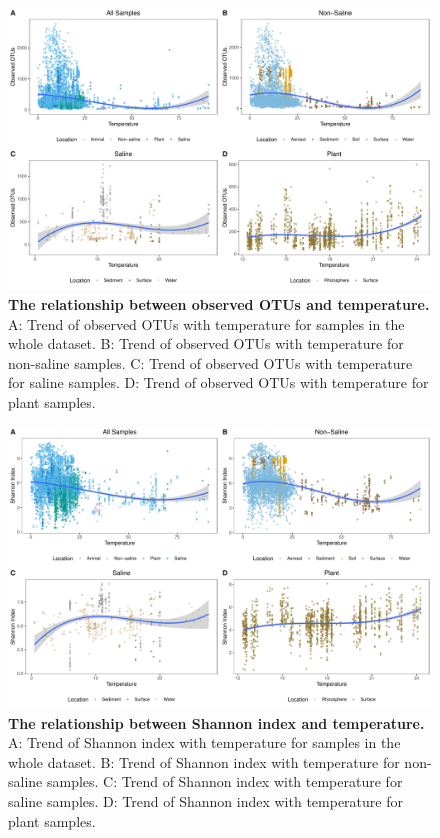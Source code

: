 \begin{figure}[H]
    \centering
    \includegraphics[scale=0.33]{./Figures/OO_T_empo2}
    \caption{\textbf{The relationship between observed OTUs and temperature.} A: Trend of observed OTUs with temperature for samples in the whole dataset. B: Trend of observed OTUs with temperature for non-saline samples. C: Trend of observed OTUs with temperature for saline samples. D: Trend of observed OTUs with temperature for plant samples.}
    \label{fig:OO_T}
\end{figure}

\begin{figure}[H]
    \centering
    \includegraphics[scale=0.33]{./Figures/Shan_T_empo2}
    \caption{\textbf{The relationship between Shannon index and temperature.} A: Trend of Shannon index with temperature for samples in the whole dataset. B: Trend of Shannon index with temperature for non-saline samples. C: Trend of Shannon index with temperature for saline samples. D: Trend of Shannon index with temperature for plant samples.}
    \label{fig:Shan_T}
\end{figure}



